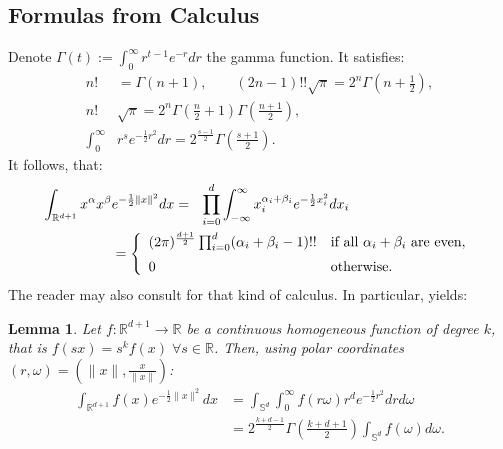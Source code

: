 \documentclass{amsart}
\newcommand{\coloneqq}{:=}
\newcommand{\R}{\mathbb{R}}
\renewcommand{\S}{\mathbb{S}}
\theoremstyle{plain}
\newtheorem{lemma}[theorem]{Lemma}
\theoremstyle{definition}
\theoremstyle{remark}
\begin{document}
\subsection{Formulas from Calculus}
Denote $\Gamma(t) \coloneqq \int_{0}^{\infty}r^{t-1}e^{-r}dr$ the gamma function. It satisfies:
\begin{align}
\label{ffgamma}
n!&=\Gamma(n+1),\qquad (2n-1)!!\sqrt{\pi} =2^{n}\Gamma\left(n+\tfrac{1}{2}\right), \\
\label{doublegamma}
n!&\sqrt{\pi}=2^{n}\Gamma\left(\tfrac{n}{2}+1\right)\Gamma\left(\tfrac{n+1}{2}\right) ,\\
\int_0^\infty& r^se^{-\frac{1}{2}r^2} dr = 2^{\frac{s-1}{2}}\Gamma\left(\tfrac{s+1}{2}\right).
\end{align}
It follows, that:
\begin{align}    \label{monoint}
 \int_{\R^{d+1}}x^\alpha x^\beta & e^{-\frac{1}{2}\|x\|^2} dx = \ \ 
\displaystyle \prod_{i=0}^d \int_{-\infty}^\infty x_i^{\alpha_i+\beta_i} e^{-\frac{1}{2}x_i^2} dx_i \\
 &= \left\{
\begin{array}{*2{l}p{5cm}}
(2 \pi)^{\frac{d+1}{2}}\prod_{i=0}^d (\alpha_i+\beta_i-1)!! &\text{if all }\alpha_i+\beta_i\text{ are even}, \vspace{0.2cm} \\ 
 0 &\text{otherwise}.
\end{array}
  \right.\nonumber
\end{align}
The reader may also consult \cite{Folland} for that kind of calculus. In particular, \cite[Eq.~(4)]{Folland} yields:
\begin{lemma}\label{homosphere}
Let $f:\R^{d+1}\rightarrow\R$ be a continuous homogeneous function of degree $k$, that is $f(sx) = s^kf(x)\; \forall s\in\!\R$. Then, using polar coordinates $(r,\omega) = (\|x\|,\frac{x}{\|x\|})$:
\begin{align*}
\int_{\R^{d+1}}f(x)e^{-\frac{1}{2}\|x\|^2} dx &= \int_{\S^d}\!\int_0^\infty\! f(r\omega) r^d e^{-\frac{1}{2}r^2}dr d\omega \\
&= 2^{\frac{k+d-1}{2}}\Gamma\!\left(\tfrac{k+d+1}{2}\right)\int_{\S^d}f(\omega)d\omega .
\end{align*}
\end{lemma}
\end{document}
